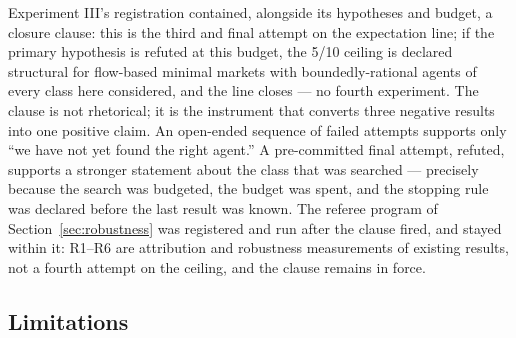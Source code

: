 \documentclass[11pt]{article}
\begin{document}
Experiment III's registration contained, alongside its hypotheses and budget,
a closure clause: this is the third and final attempt on the expectation line;
if the primary hypothesis is refuted at this budget, the 5/10 ceiling is
declared
structural for flow-based minimal markets with boundedly-rational agents of
every class here considered, and the line closes --- no fourth experiment. The
clause is not rhetorical; it is the instrument that converts three negative
results into one positive claim. An open-ended sequence of failed attempts
supports only ``we have not yet found the right agent.'' A pre-committed final
attempt, refuted, supports a stronger statement about the class that was
searched --- precisely because the search was budgeted, the budget was spent,
and the stopping rule was declared before the last result was known. The
referee program of Section~\ref{sec:robustness} was registered and run
after the clause fired, and stayed within it: R1--R6 are attribution and
robustness measurements of existing results, not a fourth attempt on the
ceiling, and the clause remains in force.

\subsection{Limitations}
\label{sec:limitations}
\end{document}
